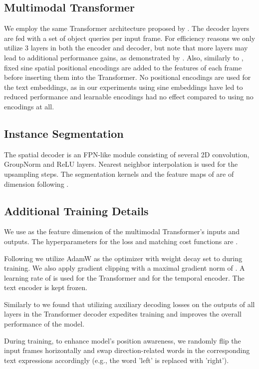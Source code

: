 \documentclass[10pt,twocolumn,letterpaper]{article}
\renewcommand{\cite}[1]{\citep{#1}}
\begin{document}
\subsection{Multimodal Transformer}
We employ the same Transformer architecture proposed by \citet{carion2020detr}. The decoder layers are fed with a set of  object queries per input frame. For efficiency reasons we only utilize 3 layers in both the encoder and decoder, but note that more layers may lead to additional performance gains, as demonstrated by \citet{carion2020detr}. Also, similarly to \citet{carion2020detr}, fixed sine spatial positional encodings are added to the features of each frame before inserting them into the Transformer. No positional encodings are used for the text embeddings, as in our experiments using sine embeddings have led to reduced performance and learnable encodings had no effect compared to using no encodings at all.

\subsection{Instance Segmentation}
The spatial decoder  is an FPN-like \cite{lin2017fpn} module consisting of several 2D convolution, GroupNorm \cite{wu2018group} and ReLU layers. Nearest neighbor interpolation is used for the upsampling steps. The segmentation kernels and the feature maps of  are of dimension  following \cite{tian2020conditional}. 

\subsection{Additional Training Details}
We use  as the feature dimension of the multimodal Transformer's inputs and outputs. The hyperparameters for the loss and matching cost functions are . 

Following \citet{carion2020detr} we utilize AdamW \cite{loshchilov2017decoupled} as the optimizer with weight decay set to  during training. We also apply gradient clipping with a maximal gradient norm of . A learning rate of  is used for the Transformer and  for the temporal encoder. The text encoder is kept frozen.

Similarly to \citet{carion2020detr} we found that utilizing auxiliary decoding losses on the outputs of all layers in the Transformer decoder expedites training and improves the overall performance of the model.

During training, to enhance model's position awareness, we randomly flip the input frames horizontally and swap direction-related words in the corresponding text expressions accordingly (e.g., the word 'left' is replaced with 'right').
\end{document}
